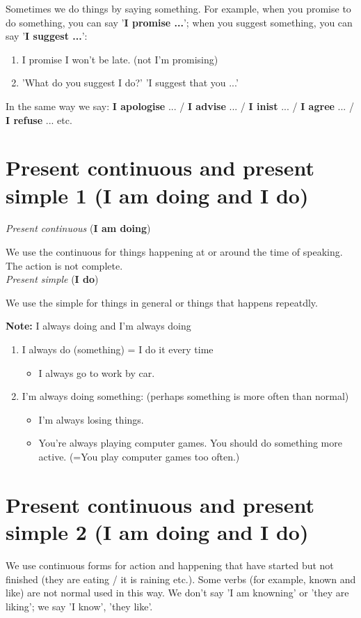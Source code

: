 \documentclass[12pt]{article}
\begin{document}
    Sometimes we do things by saying something. For example, when you promise to do something, 
    you can say '\textbf{I promise ...}'; when you suggest something, you can say '\textbf{I suggest ...}':
    \begin{enumerate}
        \item I promise I won't be late. (not I'm promising)
        \item 'What do you suggest I do?' 'I suggest that you ...'
    \end{enumerate}
    In the same way we say: \textbf{I apologise} ... / \textbf{I advise} ... / \textbf{I inist} ... / \textbf{I agree} ... /
    \textbf{I refuse} ... etc.

    \section{Present continuous and present simple 1 (I am doing and I do)}
    \textit{Present continuous} (\textbf{I am doing}) 

    We use the continuous for things happening at or around the time of speaking. The action is not complete.\\

    \textit{Present simple} (\textbf{I do})

    We use the simple for things in general or things that happens repeatdly.

    \textbf{Note:} I always doing and I'm always doing

    \begin{enumerate}
        \item I always do (something) = I do it every time
        \begin{itemize}
            \item I always go to work by car.
        \end{itemize}
        \item I'm always doing something: (perhaps something is more often than normal)
        \begin{itemize}
            \item I'm always losing things.
            \item You're always playing computer games. You should do something more active. (=You play computer games too often.)
        \end{itemize}
    \end{enumerate}

    \section{Present continuous and present simple 2 (I am doing and I do)}
    We use continuous forms for action and happening that have started but not finished (they are eating / it is raining etc.). Some
    verbs (for example, known and like) are not normal used in this way. We don't say 'I am knowning' or 'they are liking'; we say 'I know', 'they like'.
\end{document}
